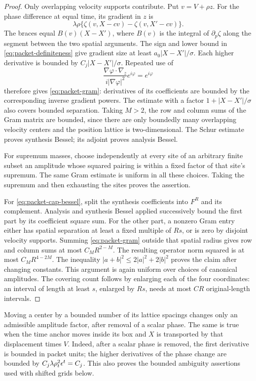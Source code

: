 \begin{proof}
Only overlapping velocity supports contribute.  Put \(v=V+\rho z\).
For the phase difference at equal time, its gradient in \(z\) is
\[
 \lambda\rho\{\zeta(v,X-cv)-\zeta(v,X'-cv)\}.
\]
The braces equal \(B(v)(X-X')\), where \(B(v)\) is the integral of
\(\partial_p\zeta\) along the segment between the two spatial
arguments.  The sign and lower bound in
\eqref{eq:packet-definiteness} give gradient size at least
\(a_0|X-X'|/\sigma\).  Each higher derivative is bounded by
\(C_j|X-X'|/\sigma\).  Repeated use of
\[
 \frac{\nabla\varphi\cdot\nabla_z}{i|\nabla\varphi|^2}
 e^{i\varphi}=e^{i\varphi}
\]
therefore gives \eqref{eq:packet-gram}: derivatives of its coefficients
are bounded by the corresponding inverse gradient powers.  The
estimate with a factor \(1+|X-X'|/\sigma\) also covers bounded
separation.  Taking \(M>2\), the row and column sums of the Gram
matrix are bounded, since there are only boundedly many overlapping
velocity centers and the position lattice is two-dimensional.
The Schur estimate proves synthesis Bessel; its adjoint proves
analysis Bessel.

For supremum masses, choose independently at every site of an arbitrary
finite subset an amplitude whose squared pairing is within a fixed
factor of that site's supremum.  The same Gram estimate is uniform in
all these choices.  Taking the supremum and then exhausting the sites
proves the assertion.

For \eqref{eq:packet-cap-bessel}, split the synthesis coefficients into
\(F^R\) and its complement.  Analysis and synthesis Bessel applied
successively bound the first part by its coefficient square sum.
For the other part, a nonzero Gram entry either has spatial separation
at least a fixed multiple of \(Rs\), or is zero by disjoint velocity
supports.  Summing \eqref{eq:packet-gram} outside that spatial radius
gives row and column sums at most \(C_MR^{2-M}\).  The resulting
operator norm squared is at most \(C_MR^{4-2M}\).  The inequality
\(|a+b|^2\le2|a|^2+2|b|^2\) proves the claim after changing constants.
This argument is again uniform over choices of canonical amplitudes.
The covering count follows by enlarging each of the four coordinates:
an interval of length at least \(s\), enlarged by \(Rs\), needs at
most \(C R\) original-length intervals.
\end{proof}

Moving a center by a bounded number of its lattice spacings changes
only an admissible amplitude factor, after removal of a scalar phase.
The same is true when the time anchor moves inside its box and \(X\)
is transported by that displacement times \(V\).  Indeed, after
a scalar phase is removed, the first derivative is bounded in packet
units; the higher derivatives of the phase change are bounded by
\(C_j\lambda\rho_t^2\epsilon^t=C_j\).  This also proves the bounded
ambiguity assertions used with shifted grids below.

